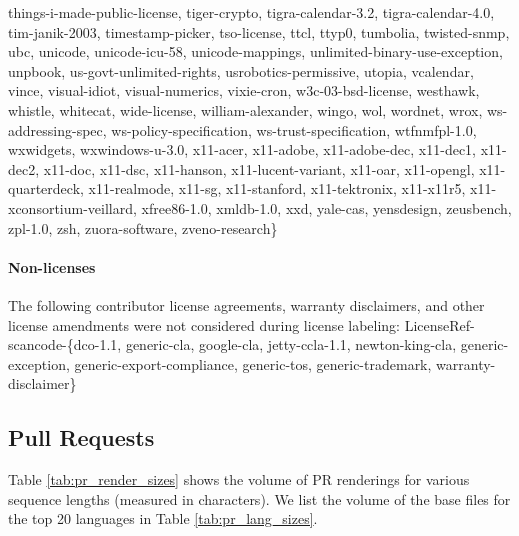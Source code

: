 \documentclass[10pt]{article} %
\begin{document}
things-i-made-public-license, tiger-crypto, tigra-calendar-3.2, tigra-calendar-4.0, tim-janik-2003, timestamp-picker, tso-license, ttcl, ttyp0, tumbolia, twisted-snmp, ubc, unicode, unicode-icu-58, unicode-mappings, unlimited-binary-use-exception, unpbook, us-govt-unlimited-rights, usrobotics-permissive, utopia, vcalendar, vince, visual-idiot, visual-numerics, vixie-cron, w3c-03-bsd-license, westhawk, whistle, whitecat, wide-license, william-alexander, wingo, wol, wordnet, wrox, ws-addressing-spec, ws-policy-specification, ws-trust-specification, wtfnmfpl-1.0, wxwidgets, wxwindows-u-3.0, x11-acer, x11-adobe, x11-adobe-dec, x11-dec1, x11-dec2, x11-doc, x11-dsc, x11-hanson, x11-lucent-variant, x11-oar, x11-opengl, x11-quarterdeck, x11-realmode, x11-sg, x11-stanford, x11-tektronix, x11-x11r5, x11-xconsortium-veillard, xfree86-1.0, xmldb-1.0, xxd, yale-cas, yensdesign, zeusbench, zpl-1.0, zsh, zuora-software, zveno-research\}

\paragraph{Non-licenses} The following contributor license agreements, warranty disclaimers, and other license amendments were not considered during license labeling: LicenseRef-scancode-\{dco-1.1, generic-cla, google-cla, jetty-ccla-1.1, newton-king-cla, generic-exception, generic-export-compliance, generic-tos, generic-trademark, warranty-disclaimer\}

\subsection{Pull Requests}\label{appendix:PRs}
Table \ref{tab:pr_render_sizes} shows the volume of PR renderings for various sequence lengths (measured in characters). We list the volume of the base files for the top 20 languages in Table \ref{tab:pr_lang_sizes}.
\end{document}
